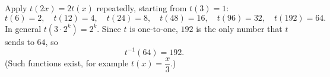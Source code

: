 Apply $t(2x)=2t(x)$ repeatedly, starting from $t(3)=1$:
\[
t(6)=2,\quad t(12)=4,\quad t(24)=8,\quad t(48)=16,\quad t(96)=32,\quad t(192)=64 .
\]
In general $t\left(3\cdot2^k\right)=2^k$. Since $t$ is one-to-one, $192$ is the only number that $t$ sends to $64$, so
\[
t^{-1}(64)=\boxed{192}.
\]
(Such functions exist, for example $t(x)=\dfrac {x}{3}$.)
